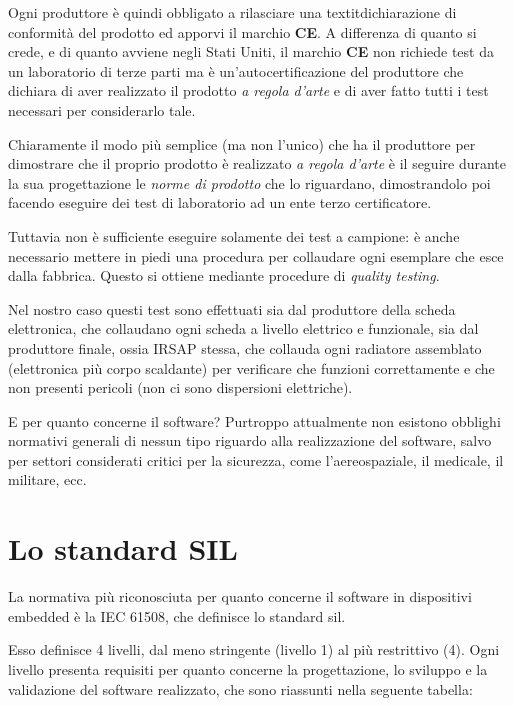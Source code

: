 \documentclass[12pt,a4paper,twoside,titlepage]{book}
\begin{document}
Ogni produttore è quindi obbligato a rilasciare una textit{dichiarazione di conformità}
del prodotto ed apporvi il marchio \textbf{CE}. A differenza di quanto si crede, e di 
quanto avviene negli Stati Uniti, il marchio \textbf{CE} non richiede test da un laboratorio 
di terze parti ma è un'autocertificazione del produttore che dichiara di aver realizzato 
il prodotto \textit{a regola d'arte} e di aver fatto tutti i test necessari per considerarlo tale. 

Chiaramente il modo più semplice (ma non l'unico) che ha il produttore per dimostrare che 
il proprio prodotto è realizzato \textit{a regola d'arte} è il seguire
durante la sua progettazione le \textit{norme di prodotto} che lo riguardano, dimostrandolo 
poi facendo eseguire dei test di laboratorio ad un ente terzo certificatore. 

Tuttavia non è sufficiente eseguire solamente dei test a campione: è anche necessario mettere 
in piedi una procedura per collaudare ogni esemplare che esce dalla fabbrica. Questo si ottiene 
mediante procedure di \textit{quality testing}. 

Nel nostro caso questi test sono effettuati sia dal produttore della scheda elettronica, 
che collaudano ogni scheda a livello elettrico e funzionale, sia dal produttore finale,
ossia IRSAP stessa, che collauda ogni radiatore assemblato (elettronica più corpo scaldante) per 
verificare che funzioni correttamente e che non presenti pericoli (non ci sono dispersioni elettriche). 

E per quanto concerne il software? Purtroppo attualmente non esistono obblighi normativi generali di 
nessun tipo riguardo alla realizzazione del software, salvo per settori considerati critici per la 
sicurezza, come l'aereospaziale, il medicale, il militare, ecc. 

\section{Lo standard SIL}

La normativa più riconosciuta per quanto concerne il software in dispositivi embedded 
è la IEC 61508, che definisce lo standard \acrfull{sil}. 

Esso definisce 4 livelli, dal meno stringente (livello 1) al più restrittivo (4). Ogni 
livello presenta requisiti per quanto concerne la progettazione, lo sviluppo e la validazione 
del software realizzato, che sono riassunti nella seguente tabella:
\end{document}
